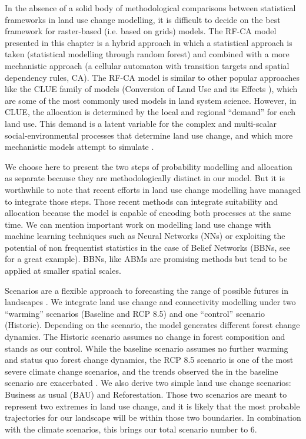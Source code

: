 In the absence of a solid body of methodological comparisons between statistical frameworks in land use change modelling, it is difficult to decide on the best framework for raster-based (i.e. based on grids) models. The RF-CA model presented in this chapter is a  hybrid approach in which a statistical approach is taken (statistical modelling through random forest) and combined with a more mechanistic approach (a cellular automaton with transition targets and spatial dependency rules, CA). The RF-CA model is similar to other popular approaches like the CLUE family of models (Conversion of Land Use and its Effects \cite{verburg_modeling_2002, verburg_combining_2009}), which are some of the most commonly used models in land system science. However, in CLUE, the allocation is determined by the local and regional “demand” for each land use. This demand is a latent variable for the complex and multi-scalar social-environmental processes that determine land use change, and which more mechanistic models attempt to simulate \citep{verburg_combining_2009}.

We choose here to present the two steps of probability modelling and allocation as separate because they are methodologically distinct in our model. But it is worthwhile to note that recent efforts in land use change modelling have managed to integrate those steps. Those recent methods can integrate suitability and allocation because the model is capable of encoding both processes at the same time. We can mention important work on modelling land use change with machine learning techniques such as Neural Networks (NNs) \citep{tayyebi_simulating_2013} or exploiting the potential of non frequentist statistics in the case of Belief Networks (BBNs, see \cite{celio_modeling_2014} for a great example). BBNs, like ABMs are promising methods but tend to be applied at smaller spatial scales.

Scenarios are a flexible approach to forecasting the range of possible futures in landscapes \citep{peterson_scenario_2003}. We integrate land use change and connectivity modelling under two “warming” scenarios (Baseline and RCP 8.5) and one “control” scenario (Historic).
Depending on the scenario, the model generates different forest change dynamics. The Historic scenario assumes no change in forest composition and stands as our control. While the baseline scenario assumes no further warming and status quo forest change dynamics, the RCP 8.5 scenario is one of the most severe climate change scenarios, and the trends observed the in the baseline scenario are exacerbated \cite{IPCC}. We also derive two simple land use change scenarios: Business as usual (BAU) and Reforestation. Those two scenarios are meant to represent two extremes in land use change, and it is likely that the most probable trajectories for our landscape will be within those two boundaries. In combination with the climate scenarios, this brings our total scenario number to 6.

